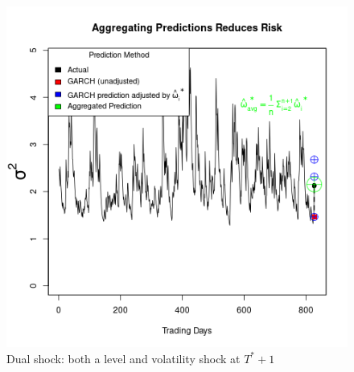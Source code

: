 \documentclass[11pt]{article}
\theoremstyle{definition}
\begin{document}
\begin{figure}[h]
  \begin{center}
    \includegraphics[scale=.5]{simulation_plots/USE_in_paper_simulation_plot_arithmetic_mean.png}
    \caption{Dual shock: both a level and volatility shock at $T^{*}+1$}
    \label{fig:arith_mean}
    \end{center}
  \end{figure}

\end{document}
